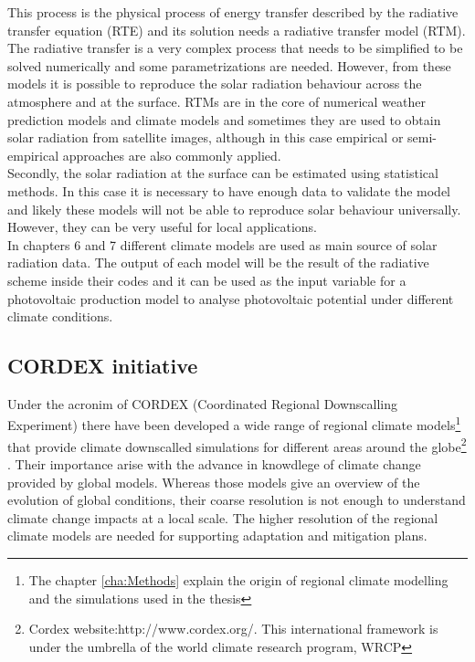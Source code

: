 This process is the physical process of energy transfer described by the radiative transfer equation (RTE) and its solution needs a radiative transfer model (RTM). The radiative transfer is a very complex process that needs to be simplified to be solved numerically and some parametrizations are needed. However, from these models it is possible to reproduce the solar radiation behaviour across the atmosphere and at the surface. RTMs are in the core of numerical weather prediction models and climate models and sometimes they are used to obtain solar radiation from satellite images, although in this case empirical or semi-empirical approaches are also commonly applied.\\

Secondly, the solar radiation at the surface can be estimated using statistical methods. In this case it is necessary to have enough data to validate the model and likely these models will not be able to reproduce solar behaviour universally. However, they can be very useful for local applications.\\

In chapters 6 and 7 different climate models are used as main source of solar radiation data. The output of each model will be the result of the radiative scheme inside their codes and it can be used as the input variable for a photovoltaic production model to analyse photovoltaic potential under different climate conditions.\\

\subsection{CORDEX initiative}

Under the acronim of CORDEX (Coordinated Regional Downscalling Experiment) there have been developed a wide range of regional climate models\footnote{The chapter \ref{cha:Methods} explain the origin of regional climate modelling and the simulations used in the thesis} that provide climate downscalled simulations for different areas around the globe\footnote{Cordex website:http://www.cordex.org/. This international framework is under the umbrella of the world climate research program, WRCP} . Their importance arise with the advance in knowdlege of climate change provided by global models. Whereas those models give an overview of the evolution of global conditions, their coarse resolution is not enough to understand climate change impacts at a local scale. The higher resolution of the regional climate models are needed for supporting adaptation and mitigation plans.\\


